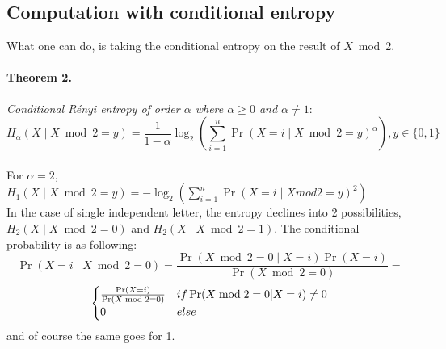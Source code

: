 \documentclass{article}
\begin{document}
\subsection{Computation with conditional entropy}
What one can do, is taking the conditional entropy on the result of $X \bmod 2$.\\
\paragraph{Theorem 2.}\textit{Conditional R\'enyi entropy of order $\alpha$ where $\alpha \geq 0$ and $\alpha \neq 1$}:
$$H_{\alpha}(X \mid X \bmod 2 = y) = \frac{1}{1-\alpha}\log_{2}(\sum_{i=1}^{n}{\Pr(X=i \mid X \bmod 2= y )^{\alpha}}) , y \in \{0,1\} $$\\
For $\alpha = 2$, $H_{1}(X \mid X \bmod 2 = y) = -\log_{2}(\sum_{i=1}^{n}{\Pr (X=i \mid X mod2 = y)^{2}})$\\
In the case of single independent letter, the entropy declines into 2 possibilities, $H_{2}(X \mid X \bmod 2 = 0) $ and $H_{2}(X \mid X \bmod 2 = 1)$. The conditional probability is as following:
$$\Pr (X=i \mid X \bmod 2 = 0 ) = \frac{\Pr(X \bmod 2 = 0 \mid X = i) \Pr(X=i)}{\Pr(X \bmod 2 =0)} = $$
\[ \begin{cases}
      \frac{\Pr(X=i)}{\Pr(X \bmod 2 =0)} $$ & if \Pr(X \bmod 2 =0| X=i) \neq 0 \\
      0 & else
   \end{cases}
\]
and of course the same goes for 1.\\
\end{document}

